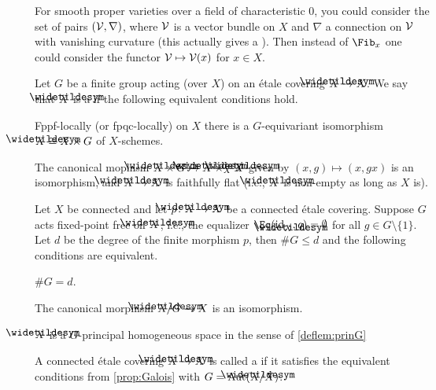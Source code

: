 \begin{rem}
	For smooth proper varieties over a field of characteristic $0$, you could consider the set of pairs $(\mathcal{V},\nabla)$, where $\mathcal{V}$ is a vector bundle on $X$ and $\nabla$ a connection on $\mathcal{V}$ with vanishing curvature (this actually gives a ). Then instead of $\Fib_x$ one could consider the functor $\mathcal{V}\mapsto\mathcal{V}(x)$ for $x\in X$.
\end{rem}
\begin{deflem}\label{deflem:prinG}
	Let $G$ be a finite group acting (over $X$) on an étale covering $\snake{X}\morphism X$. We say that $\snake{X}$ is a  if the following equivalent conditions hold.
	\begin{alphanumerate}
		\item Fppf-locally (or fpqc-locally) on $X$ there is a $G$-equivariant isomorphism $\snake{X}\cong X\times G$ of $X$-schemes.
		\item The canonical mophism $\snake{X}\times G\morphism\snake{X}\times_X\snake{X}$ given by $(x,g)\mapsto (x,gx)$ is an isomorphism, and $\snake{X}\morphism X$ is faithfully flat (i.e., $\snake{X}$ is non-empty as long as $X$ is).
	\end{alphanumerate}
\end{deflem}
\begin{prop}\label{prop:Galois}
	Let $X$ be connected and let $p\colon \snake{X}\morphism X$ be a connected étale covering. Suppose $G$ acts fixed-point free on $\snake{X}$, i.e., the equalizer $\Eq(\id_{\snake{X}},g)=\emptyset$ for all $g\in G\setminus\{1\}$. Let $d$ be the degree of the finite morphism $p$, then $\# G\leq d$ and the following conditions are equivalent.
	\begin{alphanumerate}
		\item $\# G=d$.
		\item The canonical morphism $\snake{X}/G\morphism X$ is an isomorphism.
		\item $\snake{X}$ is a $G$-principal homogeneous space in the sense of \cref{deflem:prinG}
	\end{alphanumerate}
\end{prop}
\begin{defi}\label{def:Galois}
	A connected étale covering $\snake{X}\morphism X$ is called a  if it satisfies the equivalent conditions from \cref{prop:Galois} with $G=\Aut(\snake{X}/X)$.
\end{defi}
